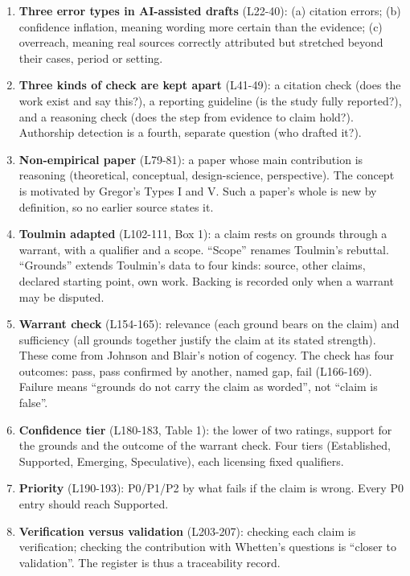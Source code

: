 {\begin{enumerate}
\def\labelenumi{\arabic{enumi}.}
\tightlist
\item
  \textbf{Three error types in AI-assisted drafts} (L22-40): (a)
  citation errors; (b) confidence inflation, meaning wording more
  certain than the evidence; (c) overreach, meaning real sources
  correctly attributed but stretched beyond their cases, period or
  setting.
\item
  \textbf{Three kinds of check are kept apart} (L41-49): a citation
  check (does the work exist and say this?), a reporting guideline (is
  the study fully reported?), and a reasoning check (does the step from
  evidence to claim hold?). Authorship detection is a fourth, separate
  question (who drafted it?).
\item
  \textbf{Non-empirical paper} (L79-81): a paper whose main contribution
  is reasoning (theoretical, conceptual, design-science, perspective).
  The concept is motivated by Gregor's Types I and V. Such a paper's
  whole is new by definition, so no earlier source states it.
\item
  \textbf{Toulmin adapted} (L102-111, Box 1): a claim rests on grounds
  through a warrant, with a qualifier and a scope. ``Scope'' renames
  Toulmin's rebuttal. ``Grounds'' extends Toulmin's data to four kinds:
  source, other claims, declared starting point, own work. Backing is
  recorded only when a warrant may be disputed.
\item
  \textbf{Warrant check} (L154-165): relevance (each ground bears on the
  claim) and sufficiency (all grounds together justify the claim at its
  stated strength). These come from Johnson and Blair's notion of
  cogency. The check has four outcomes: pass, pass confirmed by another,
  named gap, fail (L166-169). Failure means ``grounds do not carry the
  claim as worded'', not ``claim is false''.
\item
  \textbf{Confidence tier} (L180-183, Table 1): the lower of two
  ratings, support for the grounds and the outcome of the warrant check.
  Four tiers (Established, Supported, Emerging, Speculative), each
  licensing fixed qualifiers.
\item
  \textbf{Priority} (L190-193): P0/P1/P2 by what fails if the claim is
  wrong. Every P0 entry should reach Supported.
\item
  \textbf{Verification versus validation} (L203-207): checking each
  claim is verification; checking the contribution with Whetten's
  questions is ``closer to validation''. The register is thus a
  traceability record.
\end{enumerate}

}
